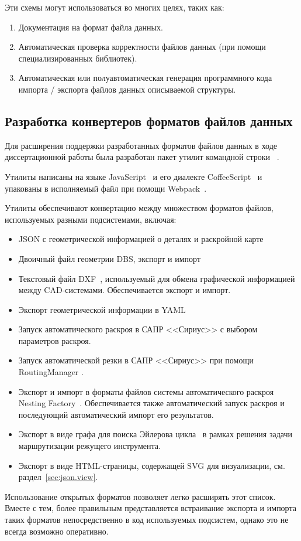 Эти схемы могут использоваться во многих целях, таких как:

\begin{enumerate}
  \item Документация на формат файла данных.
  \item Автоматическая проверка корректности файлов данных
  (при помощи специализированных библиотек).
  \item Автоматическая или полуавтоматическая генерация
  программного кода импорта / экспорта файлов данных
  описываемой структуры.
\end{enumerate}

\subsection{Разработка конвертеров форматов файлов данных}
\label{sec:json-dbs.js}

Для расширения поддержки разработанных форматов файлов данных
в ходе диссертационной работы
была разработан пакет утилит командной строки~
\cite{bi:dbs2json}.

Утилиты написаны на языке
JavaScript~\cite{bi:JavaScript}
и его диалекте
CoffeeScript~\cite{bi:CoffeeScript}
и упакованы в исполняемый файл при помощи
Webpack~\cite{bi:webpack}.

Утилиты обеспечивают конвертацию между множеством
форматов файлов,
используемых разными подсистемами,
включая:
\begin{itemize}
  \item JSON с геометрической информацией о деталях и раскройной карте
  \item Двоичный файл геометрии DBS, экспорт и импорт
  \item Текстовый файл DXF~\cite{bi:DXF},
  используемый для обмена графической информацией между CAD-системами.
  Обеспечивается экспорт и импорт.
  \item Экспорт геометрической информации в YAML~\cite{bi:YAML}
  \item Запуск автоматического раскроя в САПР <<Сириус>>
  с выбором параметров раскроя.
  \item Запуск автоматической резки в САПР <<Сириус>>
  при помощи RoutingManager
  \cite{bi:greedy,bi:RoMa}.
  \item Экспорт и импорт в форматы файлов системы автоматического раскроя
  Nesting Factory~\cite{bi:Algomate}.
  Обеспечивается также автоматический запуск раскроя
  и последующий автоматический импорт его результатов.
  \item Экспорт в виде графа для поиска
  Эйлерова цикла~\cite{bi:Makarovskikh2019Jan,Makarovskikh20181171,bi:Makarovskikh2019Other}
  в рамках решения задачи маршрутизации режущего инструмента.
  \item Экспорт в виде HTML-страницы,
  содержащей SVG
  для визуализации,
  см. раздел~\ref{sec:json.view}.
\end{itemize}

Использование открытых форматов позволяет
легко расширять этот список.
Вместе с тем,
более правильным представляется
встраивание экспорта и импорта таких форматов
непосредственно в код используемых подсистем,
однако это не всегда возможно оперативно.
